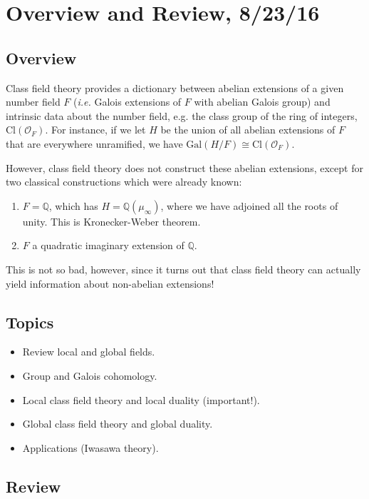 \documentclass[letterpaper, 12pt]{article}
\newcommand{\ie}{{\it i.e. }}
\newcommand{\cl}[1]{{\mathrm{Cl}(#1)}}
\newcommand{\roi}[1]{\mathcal{O}_{#1}}
\newcommand{\gal}[3]{\mathrm{Gal}(#1 #2 #3)}
\newcommand{\iso}{\cong}
\newcommand{\rats}{\mathbb{Q}}
\begin{document}
\section{Overview and Review, 8/23/16}

\subsection{Overview}
Class field theory provides a dictionary between abelian extensions of a given number field $F$ (\ie Galois extensions of $F$ with abelian Galois group) and intrinsic data about the number field, e.g. the class group of the ring of integers, $\cl{\roi F}$. For instance, if we let $H$ be the union of all abelian extensions of $F$ that are everywhere unramified, we have $\gal H/F \iso \cl{\roi F}$.

However, class field theory does not construct these abelian extensions, except for two classical constructions which were already known:
\begin{enumerate}
\item $F = \rats$, which has $H = \rats(\mu_\infty)$, where we have adjoined all the roots of unity. This is Kronecker-Weber theorem.
\item $F$ a quadratic imaginary extension of $\rats$.
\end{enumerate}
This is not so bad, however, since it turns out that class field theory can actually yield information about non-abelian extensions!

\subsection{Topics}
\begin{itemize}
\item Review local and global fields.
\item Group and Galois cohomology.
\item Local class field theory and local duality (important!).
\item Global class field theory and global duality.
\item Applications (Iwasawa theory).
\end{itemize}

\subsection{Review}
\end{document}
